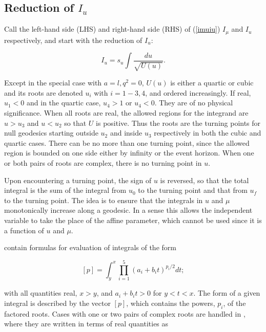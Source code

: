 \documentclass[apj]{emulateapj}
\begin{document}
\subsection{Reduction of $I_u$}

Call the left-hand side (LHS) and right-hand side (RHS) of (\ref{imuiu}) $I_\mu$ and $I_u$ respectively, and start with the reduction of $I_u$:

\begin{equation}
  I_u = s_u \int \frac{du}{\sqrt{U(u)}}.
\end{equation}

\noindent Except in the special case with $a=l, q^2=0$, $U(u)$ is either a quartic or cubic and its roots are denoted $u_i$ with $i=1-3,4$, and ordered increasingly. If real, $u_1 < 0$ and in the quartic case, $u_4 > 1$ or $u_4 < 0$. They are of no physical significance. When all roots are real, the allowed regions for the integrand are $u>u_3$ and $u<u_2$ so that $U$ is positive. Thus the roots are the turning points for null geodesics starting outside $u_2$ and inside $u_3$ respectively in both the cubic and quartic cases. There can be no more than one turning point, since the allowed region is bounded on one side either by infinity or the event horizon. When one or both pairs of roots are complex, there is no turning point in $u$. 

Upon encountering a turning point, the sign of $u$ is reversed, so that the total integral is the sum of the integral from $u_0$ to the turning point and that from $u_f$ to the turning point. The idea is to ensure that the integrals in $u$ and $\mu$ monotonically increase along a geodesic. In a sense this allows the independent variable to take the place of the affine parameter, which cannot be used since it is a function of $u$ and $\mu$.

\citet{carlsonQUART,carlson89} contain formulas for evaluation of integrals of the form

\begin{equation}\label{carlsonform}
  [p] = \int_y^x \prod_{i=1}^{5} (a_i+b_i t)^{p_i/2} dt;
\end{equation}

\noindent with all quantities real, $x > y$, and $a_i+b_i t > 0$ for $y < t < x$. The form of a given integral is described by the vector $[p]$, which contains the powers, $p_i$, of the factored roots. Cases with one or two pairs of complex roots are handled in \citet{carlson91,carlsonDOUBLE}, where they are written in terms of real quantities as
  
\end{document}
